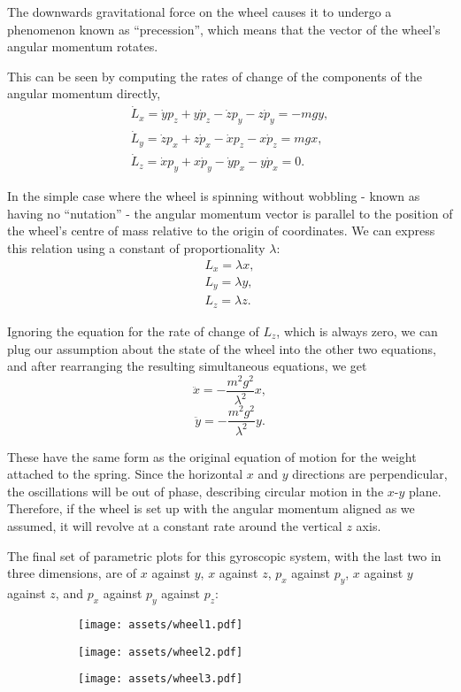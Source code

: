 \documentclass[11pt]{article}
\begin{document}
The downwards gravitational force on the wheel causes it to undergo a phenomenon known as ``precession'', which means that the vector of the wheel's angular momentum rotates.
\newpage

This can be seen by computing the rates of change of the components of the angular momentum directly,
\begin{gather*}
\dot{L}_x=\dot{y}p_z+y\dot{p}_z-\dot{z}p_y-z\dot{p}_y=-mgy,\\[4pt]
\dot{L}_y=\dot{z}p_x+z\dot{p}_x-\dot{x}p_z-x\dot{p}_z=mgx,\\[4pt]
\dot{L}_z=\dot{x}p_y+x\dot{p}_y-\dot{y}p_x-y\dot{p}_x=0.
\end{gather*}

In the simple case where the wheel is spinning without wobbling \hyp{} known as having no ``nutation'' \hyp{} the angular momentum vector is parallel to the position of the wheel's centre of mass relative to the origin of coordinates. We can express this relation using a constant of proportionality $\lambda$:
\begin{gather*}
L_x=\lambda x,\\[4pt]
L_y=\lambda y,\\[4pt]
L_z=\lambda z.
\end{gather*}

Ignoring the equation for the rate of change of $L_z$, which is always zero, we can plug our assumption about the state of the wheel into the other two equations, and after rearranging the resulting simultaneous equations, we get
$$\ddot{x}=-\frac{m^2g^2}{\lambda^2}x,$$
$$\ddot{y}=-\frac{m^2g^2}{\lambda^2}y.$$

These have the same form as the original equation of motion for the weight attached to the spring. Since the horizontal $x$ and $y$ directions are perpendicular, the oscillations will be out of phase, describing circular motion in the $x$\hyp{}$y$ plane. Therefore, if the wheel is set up with the angular momentum aligned as we assumed, it will revolve at a constant rate around the vertical $z$ axis.
\newpage

The final set of parametric plots for this gyroscopic system, with the last two in three dimensions, are of $x$ against $y$, $x$ against $z$, $p_x$ against $p_y$, $x$ against $y$ against $z$, and $p_x$ against $p_y$ against $p_z$:

\begin{figure}[htbp]
\centering
\begin{subfigure}{110pt}
\texttt{[image: assets/wheel1.pdf]}
\end{subfigure}
\begin{subfigure}{110pt}
\texttt{[image: assets/wheel2.pdf]}
\end{subfigure}
\begin{subfigure}{110pt}
\texttt{[image: assets/wheel3.pdf]}
\end{subfigure}
\label{plot:wheel1}
\end{figure}
\end{document}
